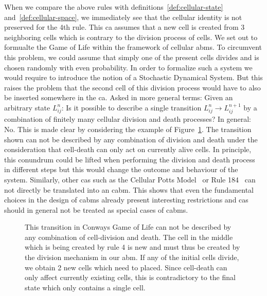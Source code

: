 \documentclass{article}
\begin{document}
When we compare the above rules with definitions~\ref{def:cellular-state}
and~\ref{def:cellular-space}, we immediately see that the cellular identity is not preserved for the
4th rule.
This \ac{ca} assumes that a new cell is created from 3 neighboring cells which is contrary to the
division process of cells.
We set out to formualte the Game of Life within the framework of cellular \acp{abm}.
To circumvent this problem, we could assume that simply one of the present cells divides and is
chosen randomly with even probability.
In order to formalize such a system we would require to introduce the notion of a
Stochastic Dynamical System.
But this raises the problem that the second cell of this division process would have to also be
inserted somewhere in the \ac{ca}.
Asked in more general terms: Given an arbitrary state $L^n_{ij}$:
Is it possible to describe a single transition $L^n_{ij}\rightarrow L^{n+1}_{ij}$ by a combination
of finitely many cellular division and death processes?
In general: No.
This is made clear by considering the example of Figure~\ref{fig:conway-non-abm-transition}.
The transition shown can not be described by any combination of division and death under the
consideration that cell-death can only act on currently alive cells.
In principle, this conundrum could be lifted when performing the division and death process in
different steps but this would change the outcome and behaviour of the system.
Similarly, other \acp{ca} such as the Cellular Potts Model~\cite{Graner1992} or Rule
184~\cite{Krug1988} can not
directly be translated into an \ac{cabm}.
This shows that even the fundamental choices in the design of \acp{cabm} already present interesting
restrictions and \acp{ca} should in general not be treated as special cases of \acp{cabm}.

\begin{figure}
    \centering
    \caption{
        This transition in Conways Game of Life can not be described by any combination of
        cell-division and death.
        The cell in the middle which is being created by rule 4 is new and must thus be created by
        the division mechanism in our \ac{abm}.
        If any of the initial cells divide, we obtain 2 new cells which need to placed.
        Since cell-death can only affect currently existing cells, this is contradictory to the
        final state which only contains a single cell.
    }
    \label{fig:conway-non-abm-transition}
\end{figure}
\end{document}
